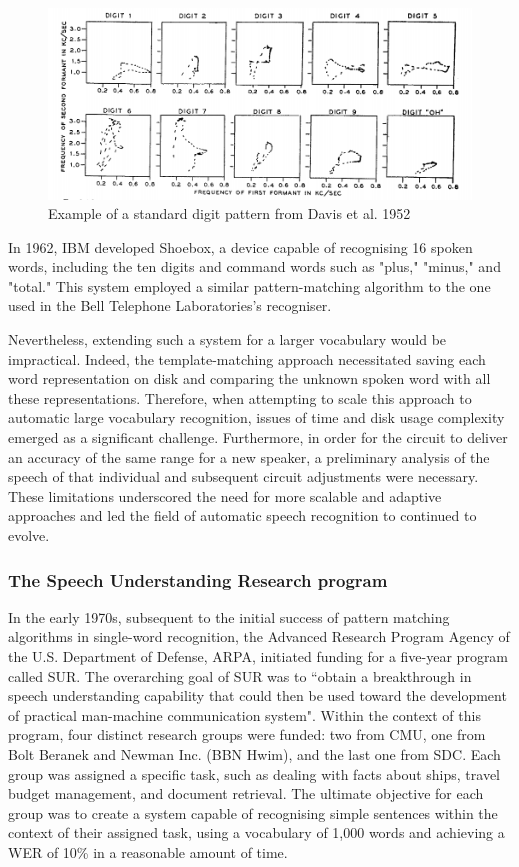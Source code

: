 \begin{figure}[h]
\includegraphics[width=\textwidth]{imgs/bell.png}
\caption{Example of a standard digit pattern from Davis et al. 1952}
\label{Bell}
\end{figure}


In 1962, IBM developed Shoebox, a device capable of recognising 16 spoken words, including the ten digits and command words such as "plus," "minus," and "total." This system employed a similar pattern-matching algorithm  to the one used in the Bell Telephone Laboratories's recogniser.


Nevertheless, extending such a system for a larger vocabulary would be impractical. Indeed, the template-matching approach necessitated saving each word representation on disk and comparing the unknown spoken word with all these representations. Therefore, when attempting to scale this approach to automatic large vocabulary recognition, issues of time and disk usage complexity emerged as a significant challenge. Furthermore, in order for the circuit to deliver an accuracy of the same range for a new speaker, a preliminary analysis of the speech of that individual and subsequent circuit adjustments were necessary. These limitations underscored the need for more scalable and adaptive approaches and led the field of automatic speech recognition to continued to evolve.



\subsubsection{The Speech Understanding Research program} 

In the early 1970s, subsequent to the initial success of pattern matching algorithms in single-word recognition, the Advanced Research Program Agency of the U.S. Department of Defense, ARPA, initiated funding for a five-year program called \ac{SUR}. The overarching goal of \ac{SUR} was to ``obtain a breakthrough in speech understanding capability that could then be used toward the development of practical man-machine communication system". Within the context of this program, four distinct research groups were funded: two from \ac{CMU}, one from Bolt Beranek and Newman Inc. (BBN Hwim), and the last one from \ac{SDC}. Each group was assigned a specific task, such as dealing with facts about ships, travel budget management, and document retrieval. The ultimate objective for each group was to create a system capable of recognising simple sentences within the context of their assigned task, using a vocabulary of 1,000 words and achieving a \ac{WER} of 10\% in a reasonable amount of time.


